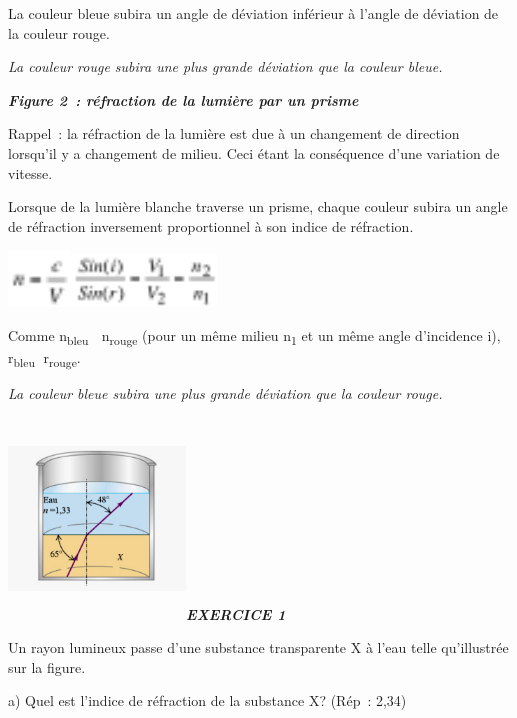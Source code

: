 La couleur bleue subira un angle de déviation inférieur à l'angle de
déviation de la couleur rouge.

\emph{La couleur rouge subira une plus grande déviation que la couleur
bleue.}

\emph{\textbf{Figure 2~: réfraction de la lumière par un prisme}}

Rappel~: la réfraction de la lumière est due à un changement de
direction lorsqu'il y a changement de milieu. Ceci étant la conséquence
d'une variation de vitesse.

Lorsque de la lumière blanche traverse un prisme, chaque couleur subira
un angle de réfraction inversement proportionnel à son indice de
réfraction.

\includegraphics[width=1.646cm,height=1.505cm]{Pictures/1000000100000017000000153E95FBDB71A73A78.png}\includegraphics[width=3.903cm,height=1.434cm]{Pictures/100000010000003E000000178A699B6CC4279ED5.png}

Comme n\textsubscript{bleu}  n\textsubscript{rouge }(pour un même
milieu n\textsubscript{1} et un même angle d'incidence i),
r\textsubscript{bleu} r\textsubscript{rouge}.

\emph{La couleur bleue subira une plus grande déviation que la couleur
rouge. }

\includegraphics[width=4.711cm,height=5.338cm]{Pictures/10000001000003FC0000033DD06925E04B0F5051.png}\emph{\textbf{EXERCICE
1}}

Un rayon lumineux passe d'une substance transparente X à l'eau telle
qu'illustrée sur la figure.

a) Quel est l'indice de réfraction de la substance X? (Rép~: 2,34)

